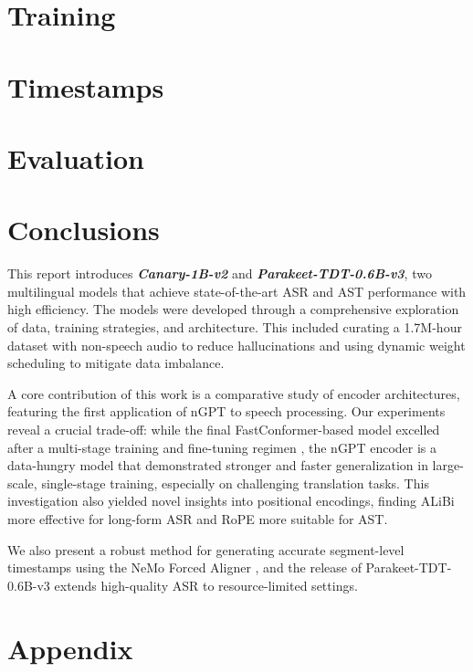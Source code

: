 \documentclass{article} %
\begin{document}
\section{Training}


\section{Timestamps}


\section{Evaluation}


\section{Conclusions}
This report introduces \textit{\textbf{Canary-1B-v2}} and \textbf{\textit{Parakeet-TDT-0.6B-v3}}, two multilingual models that achieve state-of-the-art ASR and AST performance with high efficiency. The models were developed through a comprehensive exploration of data, training strategies, and architecture. This included curating a 1.7M-hour dataset with non-speech audio to reduce hallucinations and using dynamic weight scheduling to mitigate data imbalance.

A core contribution of this work is a comparative study of encoder architectures, featuring the first application of nGPT to speech processing. Our experiments reveal a crucial trade-off: while the final FastConformer-based model excelled after a multi-stage training and fine-tuning regimen , the nGPT encoder is a data-hungry model that demonstrated stronger and faster generalization in large-scale, single-stage training, especially on challenging translation tasks. This investigation also yielded novel insights into positional encodings, finding ALiBi more effective for long-form ASR and RoPE more suitable for AST.

We also present a robust method for generating accurate segment-level timestamps using the NeMo Forced Aligner , and the release of Parakeet-TDT-0.6B-v3 extends high-quality ASR to resource-limited settings. 

  
  

\clearpage
\appendix

\section*{Appendix}
\nopagebreak[4]            %

\end{document}
